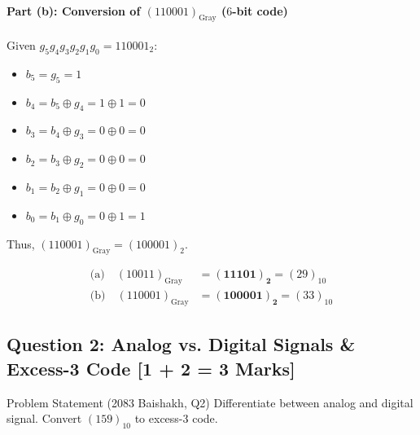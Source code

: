 \documentclass[11pt,a4paper,oneside]{book}
\begin{document}
\paragraph{Part (b): Conversion of $(110001)_{\text{Gray}}$ ($6$-bit code)}
Given $g_5 g_4 g_3 g_2 g_1 g_0 = 110001_2$:
\begin{itemize}
  \item $b_5 = g_5 = 1$
  \item $b_4 = b_5 \oplus g_4 = 1 \oplus 1 = 0$
  \item $b_3 = b_4 \oplus g_3 = 0 \oplus 0 = 0$
  \item $b_2 = b_3 \oplus g_2 = 0 \oplus 0 = 0$
  \item $b_1 = b_2 \oplus g_1 = 0 \oplus 0 = 0$
  \item $b_0 = b_1 \oplus g_0 = 0 \oplus 1 = 1$
\end{itemize}
Thus, $(110001)_{\text{Gray}} = (100001)_2$.

\begin{answerbox}
\begin{align*}
\text{(a)}\quad (10011)_{\text{Gray}} &= \mathbf{(11101)_2} = (29)_{10} \\
\text{(b)}\quad (110001)_{\text{Gray}} &= \mathbf{(100001)_2} = (33)_{10}
\end{align*}
\end{answerbox}

\vspace{0.6cm}

\subsection{Question 2: Analog vs. Digital Signals \& Excess-3 Code [1 + 2 = 3 Marks]}
\begin{questionbox}{Problem Statement (2083 Baishakh, Q2)}
Differentiate between analog and digital signal. Convert $(159)_{10}$ to excess-3 code.
\end{questionbox}
\end{document}
